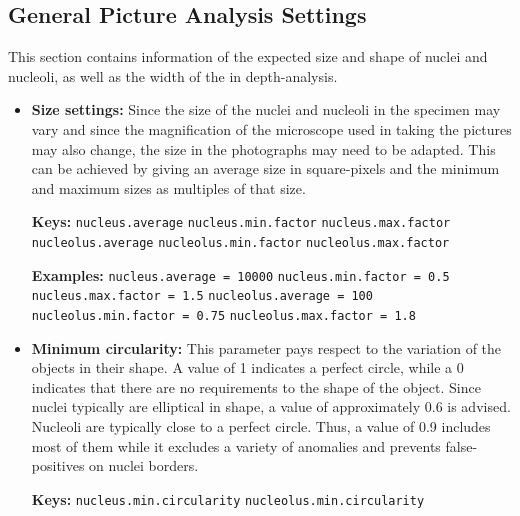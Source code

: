 \documentclass[a4paper, 12pt]{article}
\newcommand{\code}[1]{\colorbox{codegray}{\texttt{#1}}}
\begin{document}
\subsection{General Picture Analysis Settings}
This section contains information of the expected size and shape of nuclei and
nucleoli, as well as the width of the in depth-analysis.

\begin{itemize}
  \item \textbf{Size settings:} Since the size of the nuclei and nucleoli in the
  specimen may vary and since the magnification of the microscope used in taking the
  pictures may also change, the size in the photographs may need to be adapted.
  This can be achieved by giving an average size in square-pixels and the
  minimum and maximum sizes as multiples of that size.
  
  \textbf{Keys:}
  \newline \code{nucleus.average}
  \newline \code{nucleus.min.factor}
  \newline \code{nucleus.max.factor}
  \newline \code{nucleolus.average}
  \newline \code{nucleolus.min.factor}
  \newline \code{nucleolus.max.factor}
  
  \textbf{Examples:}
  \newline \code{nucleus.average = 10000}
  \newline \code{nucleus.min.factor = 0.5}
  \newline \code{nucleus.max.factor = 1.5}
  \newline \code{nucleolus.average = 100}
  \newline \code{nucleolus.min.factor = 0.75}
  \newline \code{nucleolus.max.factor = 1.8}
  
  \item \textbf{Minimum circularity:} This parameter pays respect to the
  variation of the objects in their shape. A value of 1 indicates a perfect
  circle, while a 0 indicates that there are no requirements to the shape of the
  object. Since nuclei typically are elliptical in shape, a value of
  approximately 0.6 is advised. Nucleoli are typically close to a perfect
  circle.
  Thus, a value of 0.9 includes most of them while it excludes a variety of
  anomalies and prevents false-positives on nuclei borders.
  
  \textbf{Keys:}
  \newline \code{nucleus.min.circularity}
  \newline \code{nucleolus.min.circularity}
  

\end{itemize}
\end{document}
